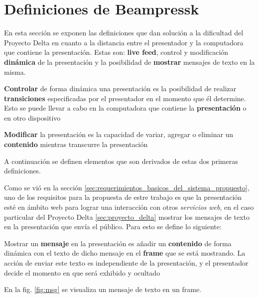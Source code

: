 	\section{Definiciones de Beampressk} %
	\label{sec:definiciones_de_beampressk}

		En esta sección se exponen las definiciones que dan solución a la dificultad del Proyecto Delta en cuanto a la distancia entre el presentador y la computadora que contiene la presentación. Estas son: \textbf{live feed}, control y modificación \textbf{dinámica} de la presentación y la posibilidad de \textbf{mostrar} mensajes de texto en la misma.

	\begin{definition}
		\textbf{Controlar} de forma dinámica una presentación es la posibilidad de realizar \textbf{transiciones} especificadas por el presentador en el momento que él determine. Esto se puede llevar a cabo en la computadora que contiene la \textbf{presentación} o en otro dispositivo
	\end{definition}

	\begin{definition}
		\textbf{Modificar} la presentación es la capacidad de variar, agregar o eliminar un \textbf{contenido} mientras transcurre la presentación
	\end{definition}

	A continuación se definen elementos que son derivados de estas dos primeras definiciones.

	Como se vió en la sección \ref{sec:requerimientos_basicos_del_sistema_propuesto}, uno de los requisitos para la propuesta de estre trabajo es que la presentación esté en ámbito web para lograr una interacción con otros \textit{servicios web}, en el caso particular del Proyecto Delta \ref{sec:proyecto_delta} mostrar los mensajes de texto en la presentación que envía el público. Para esto se define lo siguiente: 
	\begin{definition}
	\label{def:message}
		Mostrar un \textbf{mensaje} en la presentación es añadir un \textbf{contenido} de forma dinámica con el texto de dicho mensaje en el \textbf{frame} que se está mostrando. La acción de enviar este texto es independiente de la presentación, y el presentador decide el momento en que será exhibido y ocultado
	\end{definition}

	En la fig. \ref{fig:msg} se visualiza un mensaje de texto en un frame.

